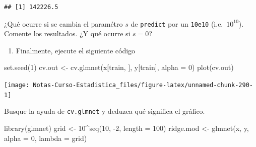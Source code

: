 \documentclass[
  12pt,
]{book}
\newenvironment{Shaded}{\begin{snugshade}}{\end{snugshade}}
\newcommand{\AttributeTok}[1]{\textcolor[rgb]{0.77,0.63,0.00}{#1}}
\newcommand{\DecValTok}[1]{\textcolor[rgb]{0.00,0.00,0.81}{#1}}
\newcommand{\FunctionTok}[1]{\textcolor[rgb]{0.00,0.00,0.00}{#1}}
\newcommand{\NormalTok}[1]{#1}
\newcommand{\OtherTok}[1]{\textcolor[rgb]{0.56,0.35,0.01}{#1}}
\newcommand{\SpecialCharTok}[1]{\textcolor[rgb]{0.00,0.00,0.00}{#1}}
\providecommand{\tightlist}{%
  \setlength{\itemsep}{0pt}\setlength{\parskip}{0pt}}
\theoremstyle{definition}
\theoremstyle{definition}
\theoremstyle{definition}
\theoremstyle{remark}
\begin{document}
\begin{verbatim}
## [1] 142226.5
\end{verbatim}

¿Qué ocurre si se cambia el paramétro \(s\) de \texttt{predict} por un \texttt{10e10} (i.e.~\(10^{10}\)). Comente los resultados. ¿Y qué ocurre si \(s=0\)?

\begin{enumerate}
\def\labelenumi{\arabic{enumi}.}
\setcounter{enumi}{2}
\tightlist
\item
  Finalmente, ejecute el siguiente código
\end{enumerate}

\begin{Shaded}
\begin{Highlighting}[]
\FunctionTok{set.seed}\NormalTok{(}\DecValTok{1}\NormalTok{)}
\NormalTok{cv.out }\OtherTok{\textless{}{-}} \FunctionTok{cv.glmnet}\NormalTok{(x[train, ], y[train], }\AttributeTok{alpha =} \DecValTok{0}\NormalTok{)}
\FunctionTok{plot}\NormalTok{(cv.out)}
\end{Highlighting}
\end{Shaded}

\begin{center}\texttt{[image: Notas-Curso-Estadistica\_files/figure-latex/unnamed-chunk-290-1]} \end{center}

Busque la ayuda de \texttt{cv.glmnet} y deduzca qué significa el gráfico.

\begin{Shaded}
\begin{Highlighting}[]
\FunctionTok{library}\NormalTok{(glmnet)}
\NormalTok{grid }\OtherTok{\textless{}{-}} \DecValTok{10}\SpecialCharTok{\^{}}\FunctionTok{seq}\NormalTok{(}\DecValTok{10}\NormalTok{, }\SpecialCharTok{{-}}\DecValTok{2}\NormalTok{, }\AttributeTok{length =} \DecValTok{100}\NormalTok{)}
\NormalTok{ridge.mod }\OtherTok{\textless{}{-}} \FunctionTok{glmnet}\NormalTok{(x, y, }\AttributeTok{alpha =} \DecValTok{0}\NormalTok{, }\AttributeTok{lambda =}\NormalTok{ grid)}
\end{Highlighting}
\end{Shaded}

\begin{Shaded}
\end{Shaded}
\end{document}
